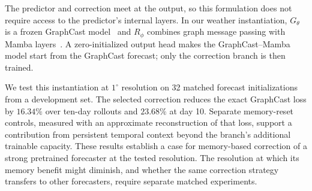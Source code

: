 \documentclass{article}
\newcommand{\suozhi}[1]{\textcolor{blue}{[suozhi: #1]}}
\renewcommand{\suozhi}[1]{}
\begin{document}
The predictor and correction meet at the output, so this formulation does not require access to the predictor's internal layers. In our weather instantiation, $G_\theta$ is a frozen GraphCast model~\citep{lam2023graphcast} and $R_\phi$ combines graph message passing with Mamba layers~\citep{gu2023mamba}. A zero-initialized output head makes the GraphCast--Mamba model start from the GraphCast forecast; only the correction branch is then trained.

We test this instantiation at $1^\circ$ resolution on 32 matched forecast initializations from a development set. The selected correction reduces the exact GraphCast loss by $16.34\%$ over ten-day rollouts and $23.68\%$ at day 10. Separate memory-reset controls, measured with an approximate reconstruction of that loss, support a contribution from persistent temporal context beyond the branch's additional trainable capacity. These results establish a case for memory-based correction of a strong pretrained forecaster at the tested resolution. The resolution at which its memory benefit might diminish, and whether the same correction strategy transfers to other forecasters, require separate matched experiments.

\suozhi{Please end the introduction with ``Our contributions are threefold.'' (1) State what new model we introduce. (2) Explain which limitation of previous models the new model addresses and how. (3) Report how the results improve, specifying the baseline, evaluation setting, and metric. Make these three contributions explicit rather than leaving readers to infer them from separate paragraphs.}

\suozhi{Please add a dedicated Related Work section and aim to finish it by approximately the end of page three. You can ask AI to examine all papers cited by a few papers you know best as a starting point for the literature review.}
\end{document}
